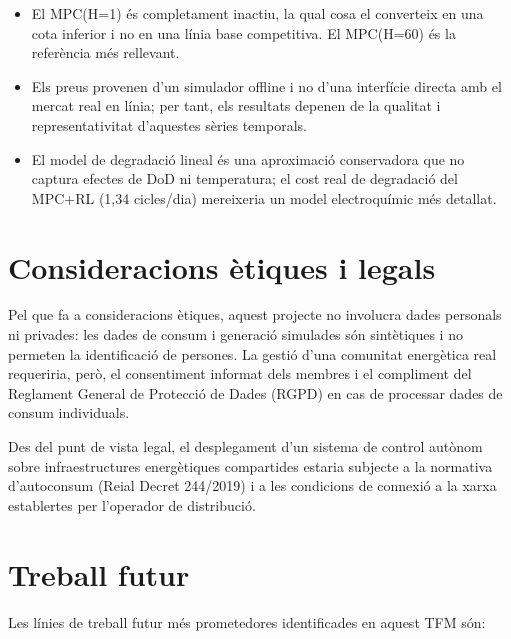 \documentclass[a4paper,12pt,twoside]{ThesisStyle}
\begin{document}
\begin{itemize}
    \item El MPC(H=1) és completament inactiu, la qual cosa el converteix en una cota inferior i no en una línia base competitiva. El MPC(H=60) és la referència més rellevant.
    \item Els preus provenen d'un simulador offline i no d'una interfície directa amb el mercat real en línia; per tant, els resultats depenen de la qualitat i representativitat d'aquestes sèries temporals.
    \item El model de degradació lineal és una aproximació conservadora que no captura efectes de DoD ni temperatura; el cost real de degradació del MPC+RL (1,34 cicles/dia) mereixeria un model electroquímic més detallat.
\end{itemize}

\section{Consideracions ètiques i legals}

Pel que fa a consideracions ètiques, aquest projecte no involucra dades personals ni privades: les dades de consum i generació simulades són sintètiques i no permeten la identificació de persones. La gestió d'una comunitat energètica real requeriria, però, el consentiment informat dels membres i el compliment del Reglament General de Protecció de Dades (RGPD) en cas de processar dades de consum individuals.

Des del punt de vista legal, el desplegament d'un sistema de control autònom sobre infraestructures energètiques compartides estaria subjecte a la normativa d'autoconsum (Reial Decret 244/2019) i a les condicions de connexió a la xarxa establertes per l'operador de distribució.

\section{Treball futur}

Les línies de treball futur més prometedores identificades en aquest TFM són:
\end{document}
